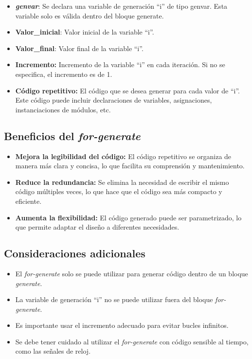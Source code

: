 \begin{itemize}
	\item \textbf{\textit{genvar}}: Se declara una variable de generación ``i'' de tipo genvar. Esta variable solo es válida dentro del bloque generate.
	\item \textbf{Valor\_inicial}: Valor inicial de la variable ``i''.
	\item \textbf{Valor\_final}: Valor final de la variable ``i''.
	\item \textbf{Incremento:} Incremento de la variable ``i'' en cada iteración. Si no se especifica, el incremento es de 1.
	\item \textbf{Código repetitivo:} El código que se desea generar para cada valor de ``i''. Este código puede incluir declaraciones de variables, asignaciones, instanciaciones de módulos, etc. \cite{chipverify}
\end{itemize}

\subsection{Beneficios del \textit{for-generate}}

\begin{itemize}
	\item \textbf{Mejora la legibilidad del código:} El código repetitivo se organiza de manera más clara y concisa, lo que facilita su comprensión y mantenimiento.
	\item \textbf{Reduce la redundancia:} Se elimina la necesidad de escribir el mismo código múltiples veces, lo que hace que el código sea más compacto y eficiente.
	\item \textbf{Aumenta la flexibilidad:} El código generado puede ser parametrizado, lo que permite adaptar el diseño a diferentes necesidades.
\end{itemize}

\subsection{Consideraciones adicionales}
\begin{itemize}
	\item El \textit{for-generate} solo se puede utilizar para generar código dentro de un bloque \textit{generate}.
	\item La variable de generación ``i'' no se puede utilizar fuera del bloque \textit{for-generate}.
	\item Es importante usar el incremento adecuado para evitar bucles infinitos.
	\item Se debe tener cuidado al utilizar el \textit{for-generate} con código sensible al tiempo, como las señales de reloj. \cite{vlsiverify}
\end{itemize}